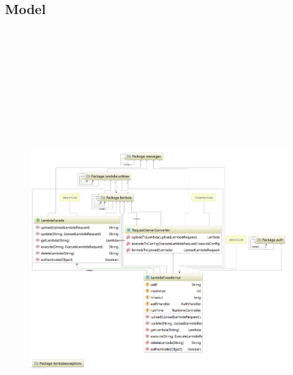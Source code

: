\documentclass[a4paper,20pt,oneside]{book}
\begin{document}
    \subsection{Model}
	    \begin{figure}[!hb]
	    	\includegraphics[width=18cm,height=20cm]{modeldiagram}
	    \end{figure}
\end{document}
